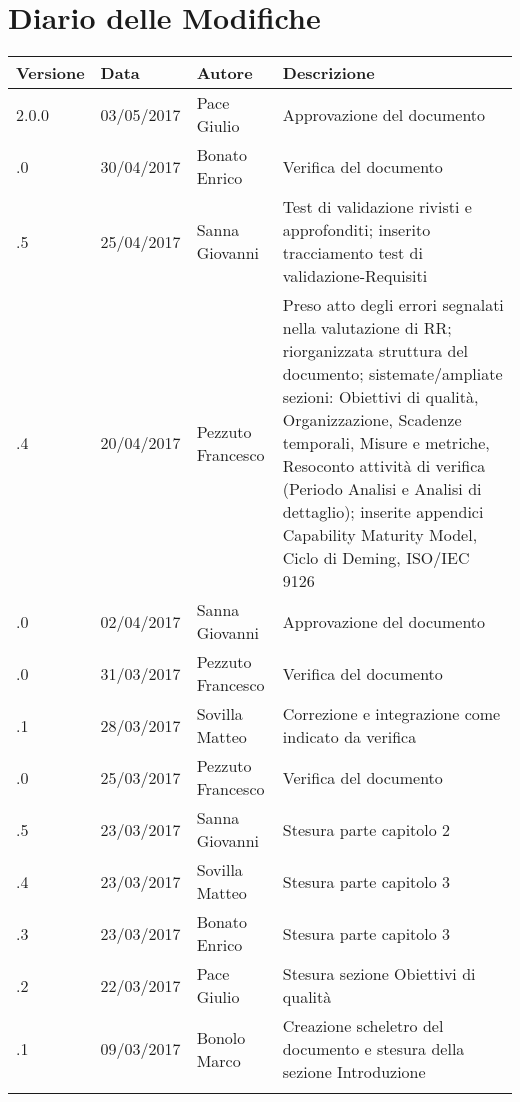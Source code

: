 \section*{Diario delle Modifiche}
\begin{longtabu} to \textwidth {
	X[4,l,p]
	X[4,l,p]
	X[4,l,p]
	X[8,l,p]}
	\toprule
		 Versione & Data & Autore & Descrizione \\
		\midrule
		\endhead
		2.0.0 & 03/05/2017 & Pace Giulio & Approvazione del documento\\
		\addlinespace[0.2em]
		\midrule
		.0 & 30/04/2017 & Bonato Enrico & Verifica del documento\\
		\addlinespace[0.2em]
		\midrule
		.5 & 25/04/2017 & Sanna Giovanni & Test di validazione rivisti e approfonditi; inserito tracciamento test di validazione-Requisiti \\
		\addlinespace[0.2em]
		\midrule
		.4 & 20/04/2017 & Pezzuto Francesco & Preso atto degli errori segnalati nella valutazione di RR; riorganizzata struttura del documento; sistemate/ampliate sezioni: Obiettivi di qualità, Organizzazione, Scadenze temporali, Misure e metriche, Resoconto attività di verifica (Periodo Analisi e Analisi di dettaglio); inserite appendici Capability Maturity Model, Ciclo di Deming, ISO/IEC 9126\\
		\addlinespace[0.2em]
		\midrule
		.0 & 02/04/2017 & Sanna Giovanni & Approvazione del documento\\
		\addlinespace[0.2em]
		\midrule
		.0 & 31/03/2017 & Pezzuto Francesco & Verifica del documento\\
		\addlinespace[0.2em]
		\midrule
		.1 & 28/03/2017 & Sovilla Matteo & Correzione e integrazione come indicato da verifica\\
		\addlinespace[0.2em]
		\midrule
		.0 & 25/03/2017 & Pezzuto Francesco & Verifica del documento\\
		\addlinespace[0.2em]
		\midrule
		.5 & 23/03/2017 & Sanna Giovanni & Stesura parte capitolo 2\\
		\addlinespace[0.2em]
		\midrule
		.4 & 23/03/2017 & Sovilla Matteo & Stesura parte capitolo 3\\
		\addlinespace[0.2em]
		\midrule
		.3 & 23/03/2017 & Bonato Enrico & Stesura parte capitolo 3\\
		\addlinespace[0.2em]
		\midrule
		.2 & 22/03/2017 & Pace Giulio & Stesura sezione Obiettivi di qualità\\
		\addlinespace[0.2em]
		\midrule
		.1 & 09/03/2017 & Bonolo Marco & Creazione scheletro del documento e stesura della sezione Introduzione\\
		\addlinespace[0.4em]
		
	\bottomrule
\end{longtabu}
